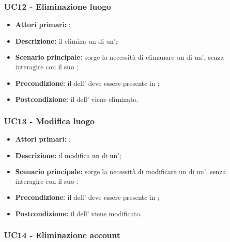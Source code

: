 \documentclass[../analisi-dei-requisiti]{subfiles}
\begin{document}
\subsubsection{UC12 - Eliminazione luogo}
\label{subsub:UC12}

\begin{itemize}
\item \textbf{Attori primari:} ;
\item \textbf{Descrizione:} il  elimina un  di un';
\item \textbf{Scenario principale:} sorge la necessità di elimanare un  di un', senza interagire con il suo ; 
\item \textbf{Precondizione:} il  dell' deve essere presente in ;
\item \textbf{Postcondizione:} il  dell' viene eliminato.

\end{itemize}

\subsubsection{UC13 - Modifica luogo}
\label{subsub:UC13}

\begin{itemize}
\item \textbf{Attori primari:} ;
\item \textbf{Descrizione:} il  modifica un  di un';
\item \textbf{Scenario principale:} sorge la necessità di modificare un  di un', senza interagire con il suo ; 
\item \textbf{Precondizione:} il  dell' deve essere presente in ;
\item \textbf{Postcondizione:} il  dell' viene modificato.

\end{itemize}

\subsubsection{UC14 - Eliminazione account}
\label{subsub:UC14}
\end{document}

